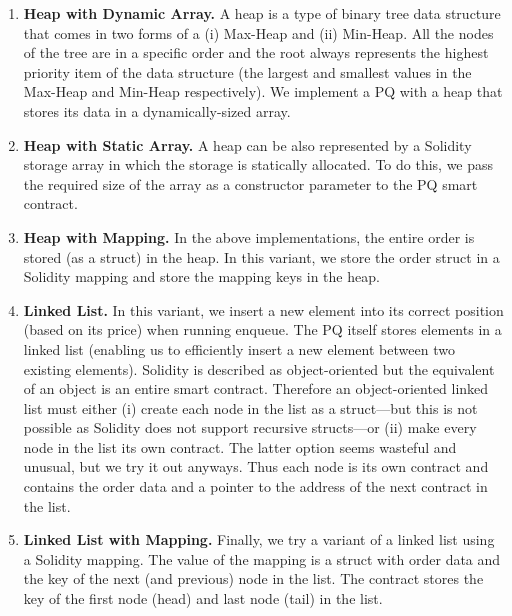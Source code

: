 \begin{enumerate}

\item \textbf{Heap with Dynamic Array.} A heap is a type of binary tree data structure that comes in two forms of a (i) Max-Heap and (ii) Min-Heap. All the nodes of the tree are in a specific order and the root always represents the highest priority item of the data structure (the largest and smallest values in the Max-Heap and Min-Heap respectively). We implement a PQ with a heap that stores its data in a dynamically-sized array. 

\item \textbf{Heap with Static Array.} A heap can be also represented by a Solidity storage array in which the storage is statically allocated. To do this, we pass the required size of the array as a constructor parameter to the PQ smart contract. 

\item \textbf{Heap with Mapping.} In the above implementations, the entire order is stored (as a struct) in the heap. In this variant, we store the order struct in a Solidity mapping and store the mapping keys in the heap.  

\item \textbf{Linked List.} In this variant, we insert a new element into its correct position (based on its price) when running enqueue. The PQ itself stores elements in a linked list (enabling us to efficiently insert a new element between two existing elements). Solidity is described as object-oriented but the equivalent of an object is an entire smart contract. Therefore an object-oriented linked list must either (i) create each node in the list as a struct---but this is not possible as Solidity does not support recursive structs---or (ii) make every node in the list its own contract. The latter option seems wasteful and unusual, but we try it out anyways. Thus each node is its own contract and contains the order data and a pointer to the address of the next contract in the list.

\item \textbf{Linked List with Mapping.} Finally, we try a variant of a linked list using a Solidity mapping. The value of the mapping is a struct with order data and the key of the next (and previous) node in the list. The contract stores the key of the first node (head) and last node (tail) in the list. 

\end{enumerate}

